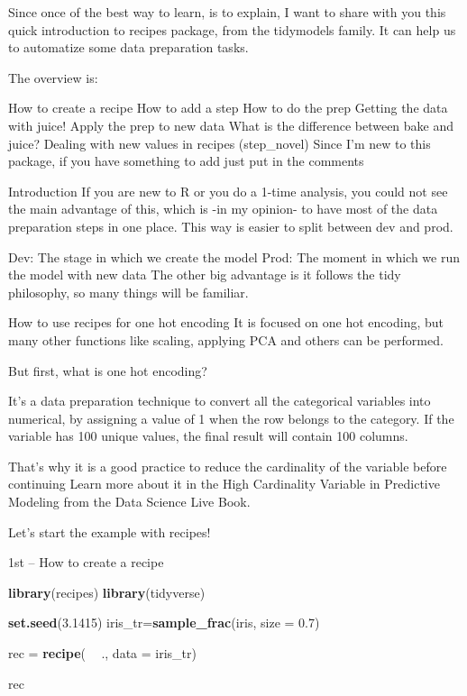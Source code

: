\documentclass[]{article}
\newenvironment{Shaded}{\begin{snugshade}}{\end{snugshade}}
\newcommand{\KeywordTok}[1]{\textcolor[rgb]{0.13,0.29,0.53}{\textbf{#1}}}
\newcommand{\DataTypeTok}[1]{\textcolor[rgb]{0.13,0.29,0.53}{#1}}
\newcommand{\FloatTok}[1]{\textcolor[rgb]{0.00,0.00,0.81}{#1}}
\newcommand{\StringTok}[1]{\textcolor[rgb]{0.31,0.60,0.02}{#1}}
\newcommand{\OperatorTok}[1]{\textcolor[rgb]{0.81,0.36,0.00}{\textbf{#1}}}
\newcommand{\NormalTok}[1]{#1}
\begin{document}
Since once of the best way to learn, is to explain, I want to share with
you this quick introduction to recipes package, from the tidymodels
family. It can help us to automatize some data preparation tasks.

The overview is:

How to create a recipe How to add a step How to do the prep Getting the
data with juice! Apply the prep to new data What is the difference
between bake and juice? Dealing with new values in recipes (step\_novel)
Since I'm new to this package, if you have something to add just put in
the comments

Introduction If you are new to R or you do a 1-time analysis, you could
not see the main advantage of this, which is -in my opinion- to have
most of the data preparation steps in one place. This way is easier to
split between dev and prod.

Dev: The stage in which we create the model Prod: The moment in which we
run the model with new data The other big advantage is it follows the
tidy philosophy, so many things will be familiar.

How to use recipes for one hot encoding It is focused on one hot
encoding, but many other functions like scaling, applying PCA and others
can be performed.

But first, what is one hot encoding?

It's a data preparation technique to convert all the categorical
variables into numerical, by assigning a value of 1 when the row belongs
to the category. If the variable has 100 unique values, the final result
will contain 100 columns.

That's why it is a good practice to reduce the cardinality of the
variable before continuing Learn more about it in the High Cardinality
Variable in Predictive Modeling from the Data Science Live Book.

Let's start the example with recipes!

1st -- How to create a recipe

\begin{Shaded}
\begin{Highlighting}[]
\KeywordTok{library}\NormalTok{(recipes)}
\KeywordTok{library}\NormalTok{(tidyverse)}

\KeywordTok{set.seed}\NormalTok{(}\FloatTok{3.1415}\NormalTok{)}
\NormalTok{iris_tr=}\KeywordTok{sample_frac}\NormalTok{(iris, }\DataTypeTok{size =} \FloatTok{0.7}\NormalTok{)}

\NormalTok{rec =}\StringTok{ }\KeywordTok{recipe}\NormalTok{( }\OperatorTok{~}\StringTok{ }\NormalTok{., }\DataTypeTok{data =}\NormalTok{ iris_tr)}

\NormalTok{rec}
\end{Highlighting}
\end{Shaded}
\end{document}
